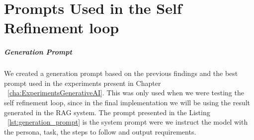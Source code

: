 
%
\chapter{Prompts Used in the Self Refinement loop}
\label{app:prompts}

\paragraph{Generation Prompt}
We created a generation prompt based on the previous findings and the best prompt used in the experiments present in Chapter ~\ref{cha:ExperimentsGenerativeAI}. This was only used when we were testing the self refinement loop, since in the final implementation we will be using the result generated in the RAG system. 
The prompt presented in the Listing ~\ref{lst:generation_prompt} is the system prompt were we instruct the model with the persona, task, the steps to follow and output requirements.


